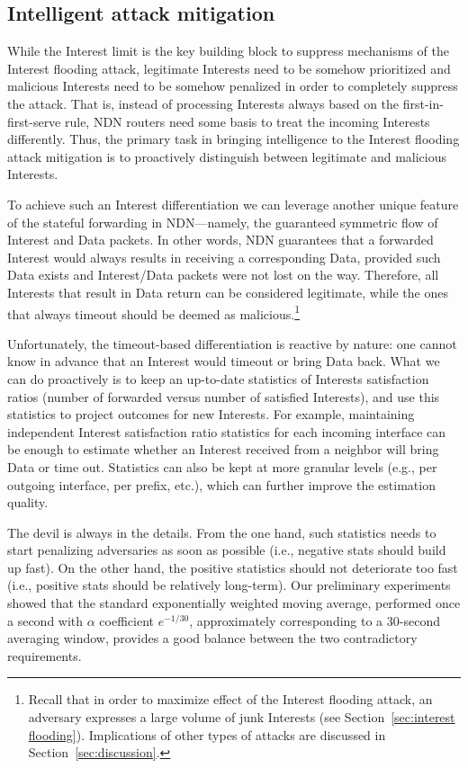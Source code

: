 
\subsection{Intelligent attack mitigation}
\label{sec:intelligent mitigating}

While the Interest limit is the key building block to suppress mechanisms of the Interest flooding attack, legitimate Interests need to be somehow prioritized and malicious Interests need to be somehow penalized in order to completely suppress the attack.
That is, instead of processing Interests always based on the first-in-first-serve rule, NDN routers need some basis to treat the incoming Interests differently.
Thus, the primary task in bringing intelligence to the Interest flooding attack mitigation is to proactively distinguish between legitimate and malicious Interests.

To achieve such an Interest differentiation we can leverage another unique feature of the stateful forwarding in NDN---namely, the guaranteed symmetric flow of Interest and Data packets.
In other words, NDN guarantees that a forwarded Interest would always results in receiving a corresponding Data, provided such Data exists and Interest/Data packets were not lost on the way.
Therefore, all Interests that result in Data return can be considered legitimate, while the ones that always timeout should be deemed as malicious.\footnote{Recall that in order to maximize effect of the Interest flooding attack, an adversary expresses a large volume of junk Interests (see Section~\ref{sec:interest flooding}).  Implications of other types of attacks are discussed in Section~\ref{sec:discussion}.}

Unfortunately, the timeout-based differentiation is reactive by nature: one cannot know in advance that an Interest would timeout or bring Data back.
What we can do proactively is to keep an up-to-date statistics of Interests satisfaction ratios (number of forwarded versus number of satisfied Interests), and use this statistics to project outcomes for new Interests.
For example, maintaining independent Interest satisfaction ratio statistics for each incoming interface can be enough to estimate whether an Interest received from a neighbor will bring Data or time out.
Statistics can also be kept at more granular levels (e.g., per outgoing interface, per prefix, etc.), which can further improve the estimation quality.

The devil is always in the details.
From the one hand, such statistics needs to start penalizing adversaries as soon as possible (i.e., negative stats should build up fast).
On the other hand, the positive statistics should not deteriorate too fast (i.e., positive stats should be relatively long-term).
Our preliminary experiments showed that the standard exponentially weighted moving average, performed once a second with $\alpha$ coefficient $e^{-1/30}$, approximately corresponding to a 30-second averaging window, provides a good balance between the two contradictory requirements.

